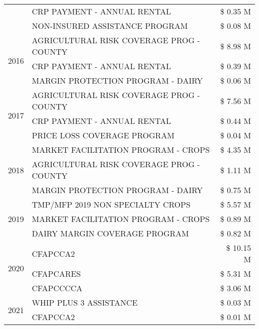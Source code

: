 \begin{tabular}{llr}
 & CRP PAYMENT - ANNUAL RENTAL & \$ 0.35 M \\
 & NON-INSURED ASSISTANCE PROGRAM & \$ 0.08 M \\
\cline{1-3}
\multirow[t]{3}{*}{2016} & AGRICULTURAL RISK COVERAGE PROG - COUNTY & \$ 8.98 M \\
 & CRP PAYMENT - ANNUAL RENTAL & \$ 0.39 M \\
 & MARGIN PROTECTION PROGRAM - DAIRY & \$ 0.06 M \\
\cline{1-3}
\multirow[t]{3}{*}{2017} & AGRICULTURAL RISK COVERAGE PROG - COUNTY & \$ 7.56 M \\
 & CRP PAYMENT - ANNUAL RENTAL & \$ 0.44 M \\
 & PRICE LOSS COVERAGE PROGRAM & \$ 0.04 M \\
\cline{1-3}
\multirow[t]{3}{*}{2018} & MARKET FACILITATION PROGRAM - CROPS & \$ 4.35 M \\
 & AGRICULTURAL RISK COVERAGE PROG - COUNTY & \$ 1.11 M \\
 & MARGIN PROTECTION PROGRAM - DAIRY & \$ 0.75 M \\
\cline{1-3}
\multirow[t]{3}{*}{2019} & TMP/MFP 2019 NON SPECIALTY CROPS & \$ 5.57 M \\
 & MARKET FACILITATION PROGRAM - CROPS & \$ 0.89 M \\
 & DAIRY MARGIN COVERAGE PROGRAM & \$ 0.82 M \\
\cline{1-3}
\multirow[t]{3}{*}{2020} & CFAPCCA2 & \$ 10.15 M \\
 & CFAPCARES & \$ 5.31 M \\
 & CFAPCCCCA & \$ 3.06 M \\
\cline{1-3}
\multirow[t]{2}{*}{2021} & WHIP PLUS 3 ASSISTANCE & \$ 0.03 M \\
 & CFAPCCA2 & \$ 0.01 M \\
\cline{1-3}
\bottomrule
\end{tabular}
